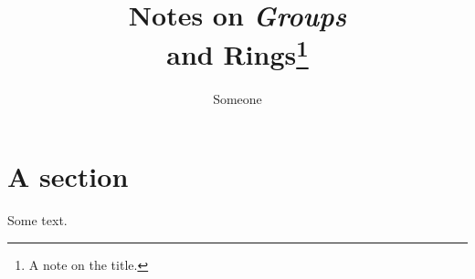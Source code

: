 \documentclass{article}
\title{Notes on \emph{Groups}\\ and Rings\thanks{A note on the title.}}
\author{Someone}
\begin{document}
\section{A section}
Some text.
\end{document}
